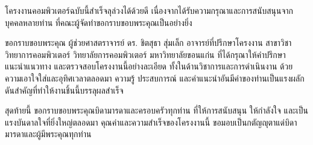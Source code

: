 โครงงานคอมพิวเตอร์ฉบับนี้สำเร็จลุล่วงได้ด้วยดี เนื่องจากได้รับความกรุณาและการสนับสนุนจากบุคคลหลายท่าน ที่คณะผู้จัดทำขอกราบขอบพระคุณเป็นอย่างยิ่ง

ขอกราบขอบพระคุณ ผู้ช่วยศาสตราจารย์ ดร. ชิตสุธา สุ่มเล็ก อาจารย์ที่ปรึกษาโครงงาน สาขาวิชาวิทยาการคอมพิวเตอร์ วิทยาลัยการคอมพิวเตอร์ มหาวิทยาลัยขอนแก่น ที่ได้กรุณาให้คำปรึกษา แนะนำแนวทาง และตรวจสอบโครงงานนี้อย่างละเอียด ทั้งในด้านวิชาการและการดำเนินงาน ด้วยความเอาใจใส่และอุทิศเวลาตลอดมา ความรู้ ประสบการณ์ และคำแนะนำอันมีค่าของท่านเป็นแรงผลักดันสำคัญที่ทำให้งานชิ้นนี้บรรลุผลสำเร็จ

สุดท้ายนี้ ขอกราบขอบพระคุณบิดามารดาและครอบครัวทุกท่าน ที่ให้การสนับสนุน ให้กำลังใจ และเป็นแรงบันดาลใจที่ยิ่งใหญ่ตลอดมา คุณค่าและความสำเร็จของโครงงานนี้ ขอมอบเป็นกตัญญุตาแด่บิดามารดาและผู้มีพระคุณทุกท่าน
